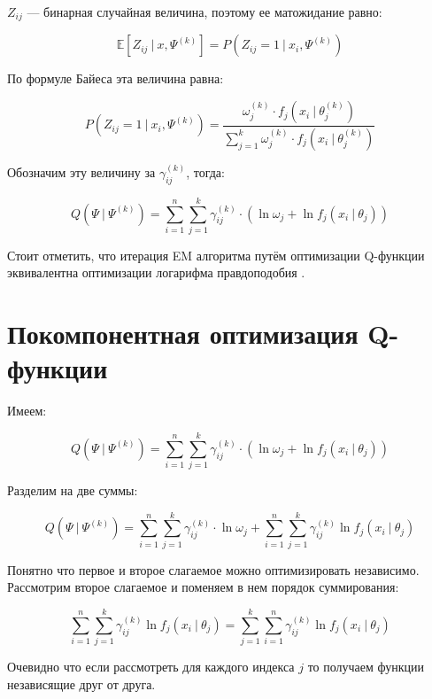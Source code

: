 \documentclass[14pt, a4paper, oneside]{memoir}
\begin{document}
$Z_{ij}$ --- бинарная случайная величина, поэтому ее матожидание равно:

\[\mathbb{E}[Z_{ij} ~|~ x, \Psi^{(k)}] = P(Z_{ij} = 1 ~|~ x_i, \Psi^{(k)})\]

По формуле Байеса эта величина равна:

\[P(Z_{ij} = 1 ~|~ x_i, \Psi^{(k)}) = \frac{\omega_j^{(k)} \cdot f_j(x_i~|~ \theta_j^{(k)})}{\sum_{j=1}^k \omega_j^{(k)} \cdot f_j(x_i~|~ \theta_j^{(k)})}\]

Обозначим эту величину за $\gamma_{ij}^{(k)}$, тогда:

\[Q(\Psi ~|~ \Psi^{(k)}) = \sum_{i=1}^n \sum_{j=1}^k \gamma_{ij}^{(k)} \cdot (\ln \omega_j + \ln f_j(x_i ~|~ \theta_j))\]

Стоит отметить, что итерация EM алгоритма путём оптимизации Q-функции эквивалентна оптимизации логарифма правдоподобия \cite{Dempster}.

\section{Покомпонентная оптимизация Q-функции}

Имеем:

\[Q(\Psi ~|~ \Psi^{(k)}) = \sum_{i=1}^n \sum_{j=1}^k \gamma_{ij}^{(k)} \cdot (\ln \omega_j + \ln f_j(x_i ~|~ \theta_j))\]

Разделим на две суммы:

\[Q(\Psi ~|~ \Psi^{(k)}) =  \sum_{i=1}^n \sum_{j=1}^k \gamma_{ij}^{(k)} \cdot \ln \omega_j +  \sum_{i=1}^n \sum_{j=1}^k  \gamma_{ij}^{(k)} \ln f_j(x_i ~|~ \theta_j)\]

Понятно что первое и второе слагаемое можно оптимизировать независимо. Рассмотрим второе слагаемое и поменяем в нем порядок суммирования:

\[\sum_{i=1}^n \sum_{j=1}^k  \gamma_{ij}^{(k)} \ln f_j(x_i ~|~ \theta_j) = \sum_{j=1}^k \sum_{i=1}^n \gamma_{ij}^{(k)}\ln f_j(x_i ~|~ \theta_j)\]

Очевидно что если рассмотреть для каждого индекса $j$ то получаем функции независящие друг от друга.
\printbibliography
\end{document}
